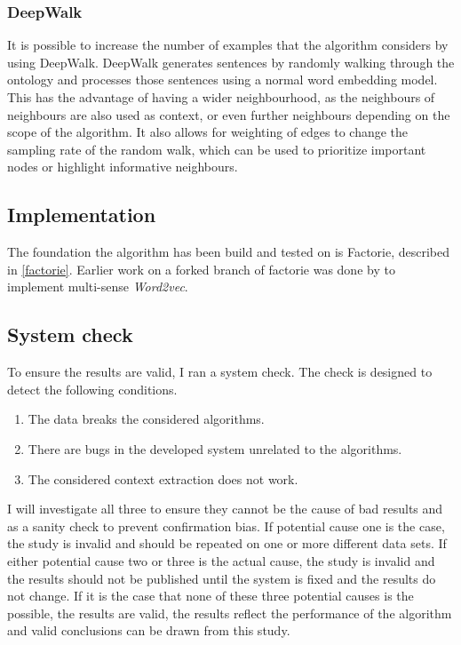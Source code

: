 \documentclass{article}
\begin{document}
 \subsubsection{DeepWalk}
  It is possible to increase the number of examples that the algorithm considers by using DeepWalk. DeepWalk generates sentences by randomly walking through the ontology and processes those sentences using a normal word embedding model. This has the advantage of having a wider neighbourhood, as the neighbours of neighbours are also used as context, or even further neighbours depending on the scope of the algorithm. It also allows for weighting of edges to change the sampling rate of the random walk, which can be used to prioritize important nodes or highlight informative neighbours. %

 \subsection{Implementation}
 The foundation the algorithm has been build and tested on is Factorie, described in \ref{factorie}. Earlier work on a forked branch of factorie was done by \cite{multisensecode} to implement multi-sense \emph{Word2vec}.
 
 
 \subsection{System check}
 To ensure the results are valid, I ran a system check. The check is designed to detect the following conditions.
  \begin{enumerate}
  \item The data breaks the considered algorithms.
  \item There are bugs in the developed system unrelated to the algorithms.
  \item The considered context extraction does not work.
  \end{enumerate}
  
  I will investigate all three to ensure they cannot be the cause of bad results and as a sanity check to prevent confirmation bias.
  If potential cause one is the case, the study is invalid and should be repeated on one or more different data sets. If either potential cause two or three is the actual cause, the study is invalid and the results should not be published until the system is fixed and the results do not change. If it is the case that none of these three potential causes is the possible, the results are valid, the results reflect the performance of the algorithm and valid conclusions can be drawn from this study.
  
\end{document}
